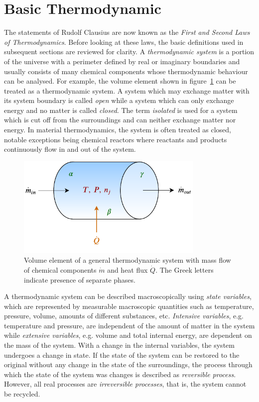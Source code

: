 \section{Basic Thermodynamic}
	The statements of Rudolf Clausius are now known as the \emph{First and Second Laws of Thermodynamics}. Before looking at these laws, the basic definitions used in subsequent sections are reviewed for clarity. A \emph{thermodynamic system} is a portion of the universe with a perimeter defined by real or imaginary boundaries and usually consists of many chemical components whose thermodynamic behaviour can be analysed. For example, the volume element shown in figure~\ref{fig:system} can be treated as a thermodynamic system. A system which may exchange matter with its system boundary is called \emph{open} while a system which can only exchange energy and no matter is called \emph{closed}. The term \emph{isolated} is used for a system which is cut off from the surroundings and can neither exchange matter nor energy. In material thermodynamics, the system is often treated as closed, notable exceptions being chemical reactors where reactants and products continuously flow in and out of the system.
 	\begin{figure}[htb]
		\centering
		\includegraphics[width=0.8\textwidth]{figures/System.pdf}
		\caption{Volume element of a general thermodynamic system with mass flow of chemical components $\dot{m}$ and heat flux $\dot{Q}$. The Greek letters indicate presence of separate phases.}
		\label{fig:system}
	\end{figure}

	A thermodynamic system can be described macroscopically using \emph{state variables}, which are represented by measurable macroscopic quantities such as temperature, pressure, volume, amounts of different substances, etc. \emph{Intensive variables}, e.g. temperature and pressure,  are independent of the amount of matter in the system  while  \emph{extensive variables}, e.g. volume and total internal energy, are dependent on the mass of the system.  With a change in the internal variables, the system undergoes a change in state. If the state of the system can be restored to the original without any change in the state of the surroundings, the process through which the state of the system was changes is described as \emph{reversible process}. However, all real processes are \emph{irreversible processes}, that is, the system cannot be recycled.

